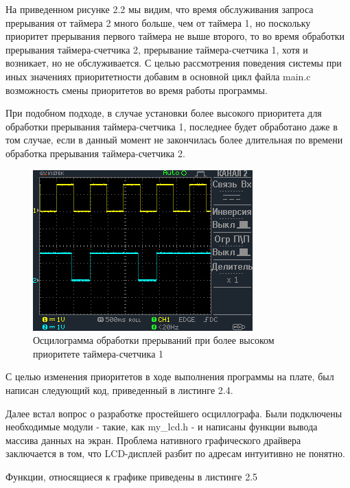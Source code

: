 \documentclass[14pt,a4paper,report]{report}
\begin{document}
На приведенном рисунке 2.2 мы видим, что  время обслуживания запроса прерывания от таймера 2 много больше, чем от таймера 1, но поскольку приоритет прерывания первого таймера не выше второго, то во время обработки прерывания таймера-счетчика 2, прерывание таймера-счетчика 1, хотя и возникает, но не обслуживается.
С целью рассмотрения поведения системы при иных значениях приоритетности добавим в основной цикл файла main.c возможность смены приоритетов во время работы программы.

При подобном подходе, в случае установки более высокого приоритета для обработки прерывания таймера-счетчика 1, последнее будет обработано даже в том случае, если в данный момент не закончилась более длительная по времени обработка прерывания таймера-счетчика 2. 

\begin{figure}[h!]
	\centering
	\includegraphics[scale = 1]{img/2_2.png}
	\caption{Осцилограмма обработки прерываний при более высоком приоритете таймера-счетчика 1}
\end{figure}

С целью изменения приоритетов в ходе выполнения программы на плате, был написан следующий код, приведенный в листинге 2.4.



Далее встал вопрос о разработке простейшего осциллографа. Были подключены необходимые модули - такие, как my\_lcd.h - и написаны функции вывода массива данных на экран. Проблема нативного графического драйвера заключается в том, что LCD-дисплей разбит по адресам интуитивно не понятно.

Функции, относящиеся к графике приведены в листинге 2.5


\end{document}
